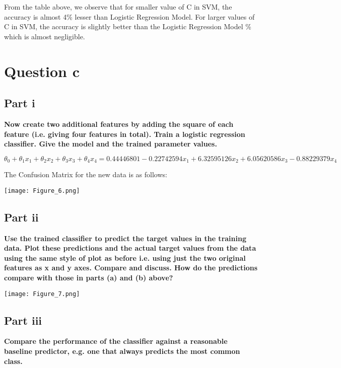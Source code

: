 \documentclass[10pt]{article}
\begin{document}
From the table above, we observe that for smaller value of C in SVM, the accuracy is almost 4\% lesser than Logistic Regression Model. For larger values of C in SVM, the accuracy is slightly better than the Logistic Regression Model \% which is almost negligible.

\section*{Question c}
\subsection*{Part i}
\textbf{Now create two additional features by adding the square of each feature (i.e.
giving four features in total). Train a logistic regression classifier. Give the
model and the trained parameter values.}
\vspace{1mm}
\begin{center}
\begin{equation*}
  \theta_{0} + \theta_{1}x_{1} + \theta_{2}x_{2} + \theta_{3}x_{3} + \theta_{4}x_{4} = 0.44446801 - 0.22742594x_{1} + 6.32595126x_{2} + 6.05620586x_{3} - 0.88229379x_{4}
\end{equation*}
\end{center}

The Confusion Matrix for the new data is as follows:
\begin{center}
  \texttt{[image: Figure\_6.png]}
\end{center}


\subsection*{Part ii}
\textbf{Use the trained classifier to predict the target values in the training data. Plot
these predictions and the actual target values from the data using the same
style of plot as before i.e. using just the two original features as x and y axes.
Compare and discuss. How do the predictions compare with those in parts (a)
and (b) above?}

\begin{center}
  \texttt{[image: Figure\_7.png]}
\end{center}

\subsection*{Part iii}
\textbf{Compare the performance of the classifier against a reasonable baseline predictor, e.g. one that always predicts the most common class.}
\vspace{1mm}
\end{document}
